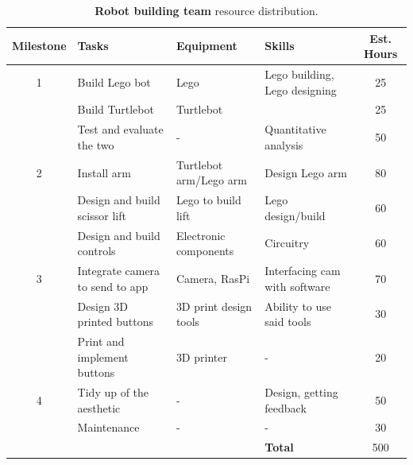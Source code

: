 \documentclass{article}
\begin{document}
\begin{table}[]
  \begin{center}
  \begin{small}
  \begin{tabular}{|c|l|l|l|c|}
    \hline
    {\bf Milestone} & {\bf Tasks} & {\bf Equipment} & {\bf Skills} & {\bf Est. Hours} \\ \hline
    1               & Build Lego bot & Lego & Lego building, Lego designing & 25 \\ \cline{2-5}
                    & Build Turtlebot & Turtlebot &  & 25 \\ \cline{2-5}
                    & Test and evaluate the two & - & Quantitative analysis & 50 \\ \hline
    2               & Install arm & Turtlebot arm/Lego arm & Design Lego arm & 80 \\ \cline{2-5}
                    & Design and build scissor lift & Lego to build lift & Lego design/build & 60 \\ \cline{2-5}
                    & Design and build controls & Electronic components & Circuitry & 60 \\ \hline
    3               & Integrate camera to send to app & Camera, RasPi & Interfacing cam with software & 70 \\ \cline{2-5}
                    & Design 3D printed buttons & 3D print design tools & Ability to use said tools & 30 \\ \cline{2-5}
                    & Print and implement buttons & 3D printer & - & 20 \\ \hline
    4               & Tidy up of the aesthetic & - & Design, getting feedback & 50 \\ \cline{2-5}
                    & Maintenance & - & - & 30 \\ \hline
                    &                           &  & {\bf Total} & 500 \\ \hline
  \end{tabular}
  \end{small}
  \caption{{\bf Robot building team} resource distribution.}
  \end{center}
\end{table}
\end{document}
